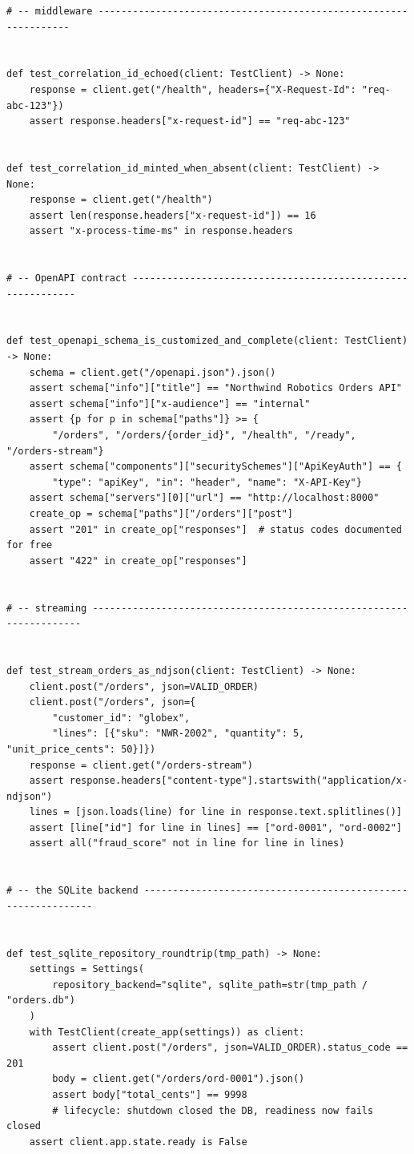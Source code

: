 \begin{verbatim}
# -- middleware -----------------------------------------------------------------


def test_correlation_id_echoed(client: TestClient) -> None:
    response = client.get("/health", headers={"X-Request-Id": "req-abc-123"})
    assert response.headers["x-request-id"] == "req-abc-123"


def test_correlation_id_minted_when_absent(client: TestClient) -> None:
    response = client.get("/health")
    assert len(response.headers["x-request-id"]) == 16
    assert "x-process-time-ms" in response.headers


# -- OpenAPI contract ------------------------------------------------------------


def test_openapi_schema_is_customized_and_complete(client: TestClient) -> None:
    schema = client.get("/openapi.json").json()
    assert schema["info"]["title"] == "Northwind Robotics Orders API"
    assert schema["info"]["x-audience"] == "internal"
    assert {p for p in schema["paths"]} >= {
        "/orders", "/orders/{order_id}", "/health", "/ready", "/orders-stream"}
    assert schema["components"]["securitySchemes"]["ApiKeyAuth"] == {
        "type": "apiKey", "in": "header", "name": "X-API-Key"}
    assert schema["servers"][0]["url"] == "http://localhost:8000"
    create_op = schema["paths"]["/orders"]["post"]
    assert "201" in create_op["responses"]  # status codes documented for free
    assert "422" in create_op["responses"]


# -- streaming --------------------------------------------------------------------


def test_stream_orders_as_ndjson(client: TestClient) -> None:
    client.post("/orders", json=VALID_ORDER)
    client.post("/orders", json={
        "customer_id": "globex",
        "lines": [{"sku": "NWR-2002", "quantity": 5, "unit_price_cents": 50}]})
    response = client.get("/orders-stream")
    assert response.headers["content-type"].startswith("application/x-ndjson")
    lines = [json.loads(line) for line in response.text.splitlines()]
    assert [line["id"] for line in lines] == ["ord-0001", "ord-0002"]
    assert all("fraud_score" not in line for line in lines)


# -- the SQLite backend -------------------------------------------------------------


def test_sqlite_repository_roundtrip(tmp_path) -> None:
    settings = Settings(
        repository_backend="sqlite", sqlite_path=str(tmp_path / "orders.db")
    )
    with TestClient(create_app(settings)) as client:
        assert client.post("/orders", json=VALID_ORDER).status_code == 201
        body = client.get("/orders/ord-0001").json()
        assert body["total_cents"] == 9998
        # lifecycle: shutdown closed the DB, readiness now fails closed
    assert client.app.state.ready is False



\end{verbatim}
